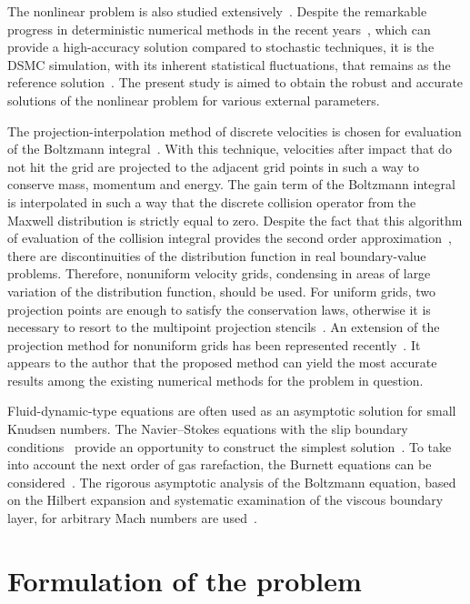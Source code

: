 \documentclass[aip,pof,preprint]{revtex4-1}
\begin{document}
The nonlinear problem is also studied extensively~\cite{Garzo2003}.
Despite the remarkable progress in deterministic numerical methods
in the recent years~\cite{Dimarco2014,Mieussens2014},
which can provide a high-accuracy solution compared to stochastic techniques,
it is the DSMC simulation, with its inherent statistical fluctuations,
that remains as the reference solution~\cite{Cercignani1994}.
The present study is aimed to obtain the robust and accurate solutions
of the nonlinear problem for various external parameters.

The projection-interpolation method of discrete velocities is chosen for
evaluation of the Boltzmann integral~\cite{Tcheremissine1998, Tcheremissine2006}.
With this technique, velocities after impact that do not hit the grid
are projected to the adjacent grid points in such a way to conserve mass, momentum and energy.
The gain term of the Boltzmann integral is interpolated in such a way that
the discrete collision operator from the Maxwell distribution is strictly equal to zero.
Despite the fact that this algorithm of evaluation of the collision integral
provides the second order approximation~\cite{Anikin2012},
there are discontinuities of the distribution function in real boundary-value problems.
Therefore, nonuniform velocity grids, condensing in areas of large variation
of the distribution function, should be used.
For uniform grids, two projection points are enough to satisfy the conservation laws,
otherwise it is necessary to resort to the multipoint projection stencils~\cite{Dodulad2012}.
An extension of the projection method for nonuniform grids has been represented recently~\cite{Dodulad2015}.
It appears to the author that the proposed method can yield the most accurate results
among the existing numerical methods for the problem in question.

Fluid-dynamic-type equations are often used as an asymptotic solution for small Knudsen numbers.
The Navier--Stokes equations with the slip boundary conditions~\cite{Ohwada1989a}
provide an opportunity to construct the simplest solution~\cite{Sharipov2000}.
To take into account the next order of gas rarefaction, the Burnett equations can be considered~\cite{Reese2003}.
The rigorous asymptotic analysis of the Boltzmann equation,
based on the Hilbert expansion and systematic examination of the viscous boundary layer,
for arbitrary Mach numbers are used~\cite{Sone2000}.

\section{Formulation of the problem}
\end{document}
